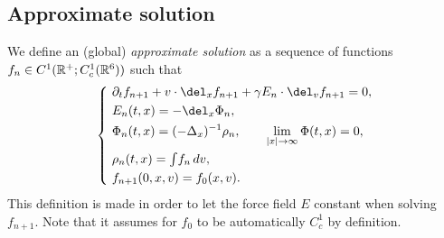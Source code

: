 \documentclass[11pt]{amsart}
\begin{document}
\subsection{Approximate solution}

\begin{defn}
We define an (global) \emph{approximate solution} as a sequence of functions $f_n\in C^1(\mathbb{R}^+;C_c^1(\mathbb{R}^6))$ such that
\[\left\{\ \begin{alignedat}{2}
&\pd_tf_{n+1}+v\cdot\del_xf_{n+1}+\gamma E_n\cdot\del_vf_{n+1}=0,\\
&E_n(t,x)=-\del_x\Phi_n,\\
&\Phi_n(t,x)=(-\Delta_x)^{-1}\rho_n,\qquad\lim_{|x|\to\infty}\Phi(t,x)=0,\\
&\rho_n(t,x)=\tint f_n\,dv,\\
&f_{n+1}(0,x,v)=f_0(x,v).
\end{alignedat}\right.\]
This definition is made in order to let the force field $E$ constant when solving $f_{n+1}$.
Note that it assumes for $f_0$ to be automatically $C_c^1$ by definition.
\end{defn}
\end{document}

